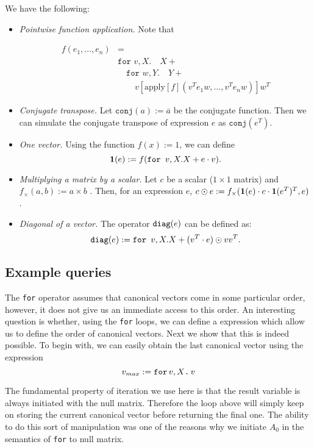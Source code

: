 We have the following:

\begin{itemize}
\item {\em Pointwise function application.} Note that

\begin{align*}
f(e_1,\ldots, e_n)&=\\ 
&\texttt{for }v,X.\quad X + \\
&\quad \texttt{for }w,Y.\quad Y + \\ 
&\quad \quad v\left[ \text{apply}[f](v^Te_1w, \ldots, v^Te_nw) \right] w^T 
\end{align*}

\item {\em Conjugate transpose.} Let $\texttt{conj}(a) := \overline{a}$ be the conjugate function. Then we can simulate the conjugate transpose of expression $e$ as $\texttt{conj}(e^T)$.
\item {\em One vector.} Using the function $f(x) := 1$, we can define $$\mathbf{1}(e) := f(\texttt{for } v,X. X + e\cdot v).$$
\item {\em Multiplying a matrix by a scalar.} Let $c$ be a scalar ($1\times 1$ matrix) and $f_{\times}(a, b) := a \times b$ . Then, for an expression $e$, $c\odot e := f_{\times}(\mathbf{1}(e)\cdot c \cdot \mathbf{1}(e^T)^T, e)$.
\item {\em Diagonal of a vector.} The operator $\texttt{diag}(e)$ can be defined as:
$$\texttt{diag}(e) := \texttt{for } v, X. X + (v^T\cdot e) \odot vv^T.$$
\end{itemize}

\subsection{Example queries}

 The \texttt{for} operator assumes that canonical vectors come in some particular order, however, it does not give us an immediate access to this order. An interesting question is whether, using the \texttt{for} loops, we can define a \langfor expression which allow us to define the order of canonical vectors. Next we show that this is indeed possible. To begin with, we can easily obtain the last canonical vector using the expression $$v_{max} := \texttt{for}\, v,X \texttt{.}\, v$$

The fundamental property of iteration we use here is that the result variable is always initiated with the null matrix. Therefore the loop above will simply keep on storing the current canonical vector before returning the final one. The ability to do this sort of manipulation was one of the reasons why we initiate $A_0$ in the semantics of \texttt{for} to null matrix.

